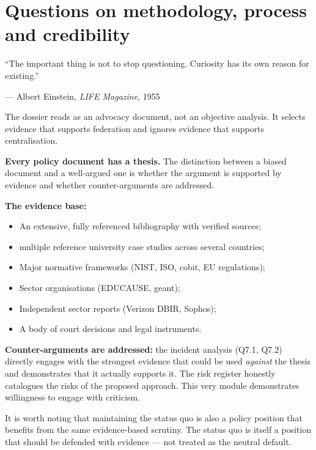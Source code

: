 \section{Questions on methodology, process and credibility}
\label{sec:q-meta}

\epigraph{``The important thing is not to stop questioning. Curiosity has its own reason for existing.''}{--- Albert Einstein, \textit{LIFE Magazine}, 1955}

\begin{clarificationbox}
The dossier reads as an advocacy document, not an objective analysis. It selects evidence that supports federation and ignores evidence that supports centralisation.
\end{clarificationbox}

\begin{answerbox}[Answer to Q10.1]
\textbf{Every policy document has a thesis.} The distinction between a biased document and a well-argued one is whether the argument is supported by evidence and whether counter-arguments are addressed.

\medskip\noindent\textbf{The evidence base:}
\begin{itemize}[nosep]
    \item An extensive, fully referenced bibliography with verified sources;
    \item multiple reference university case studies across several countries;
    \item Major normative frameworks (NIST, ISO, \gls{cobit}, EU regulations);
    \item Sector organisations (EDUCAUSE, \gls{geant});
    \item Independent sector reports (Verizon DBIR, Sophos);
    \item A body of court decisions and legal instruments.
\end{itemize}

\noindent\textbf{Counter-arguments are addressed:} the incident analysis (Q7.1, Q7.2) directly engages with the strongest evidence that could be used \emph{against} the thesis and demonstrates that it actually supports it. The risk register honestly catalogues the risks of the proposed approach. This very module demonstrates willingness to engage with criticism.

\medskip\noindent It is worth noting that maintaining the status quo is also a policy position that benefits from the same evidence-based scrutiny. The status quo is itself a position that should be defended with evidence --- not treated as the neutral default.
\end{answerbox}

